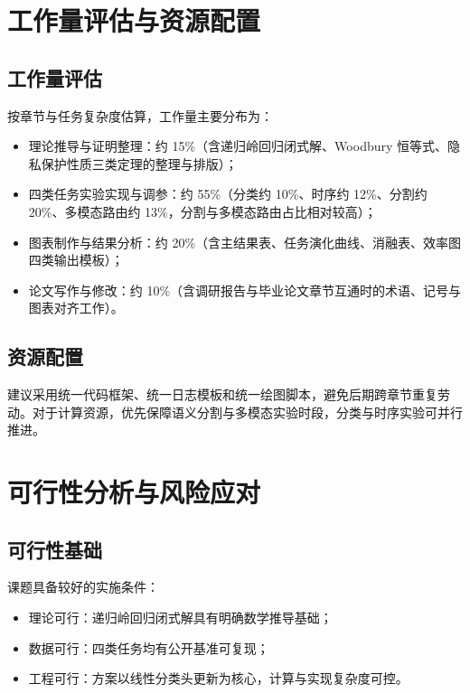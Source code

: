 \section{工作量评估与资源配置}

\subsection{工作量评估}

按章节与任务复杂度估算，工作量主要分布为：
\begin{itemize}
    \item 理论推导与证明整理：约 15\%（含递归岭回归闭式解、Woodbury 恒等式、隐私保护性质三类定理的整理与排版）；
    \item 四类任务实验实现与调参：约 55\%（分类约 10\%、时序约 12\%、分割约 20\%、多模态路由约 13\%，分割与多模态路由占比相对较高）；
    \item 图表制作与结果分析：约 20\%（含主结果表、任务演化曲线、消融表、效率图四类输出模板）；
    \item 论文写作与修改：约 10\%（含调研报告与毕业论文章节互通时的术语、记号与图表对齐工作）。
\end{itemize}

\subsection{资源配置}

建议采用统一代码框架、统一日志模板和统一绘图脚本，避免后期跨章节重复劳动。对于计算资源，优先保障语义分割与多模态实验时段，分类与时序实验可并行推进。

\section{可行性分析与风险应对}

\subsection{可行性基础}

课题具备较好的实施条件：
\begin{itemize}
    \item 理论可行：递归岭回归闭式解具有明确数学推导基础；
    \item 数据可行：四类任务均有公开基准可复现；
    \item 工程可行：方案以线性分类头更新为核心，计算与实现复杂度可控。
\end{itemize}



